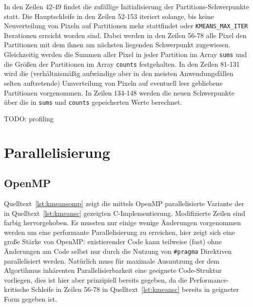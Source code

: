 \documentclass[ngerman, cd=lightcolor, cdmath=false]{tudscrreprt}
\begin{document}
In den Zeilen 42-49 findet die zufällige Initialisierung der
Partitions-Schwerpunkte statt. Die Hauptschleife in den Zeilen 52-153 iteriert
solange, bis keine Neuverteilung von Pixeln auf Partitionen mehr stattfindet
oder \texttt{KMEANS\_MAX\_ITER} Iterationen erreicht worden sind. Dabei werden
in den Zeilen 56-78 alle Pixel den Partitionen mit dem ihnen am nächsten
liegenden Schwerpunkt zugewiesen. Gleichzeitig werden die Summen aller Pixel in
jeder Partition im Array \texttt{sums} und die Größen der Partitionen im Array
\texttt{counts} festgehalten. In den Zeilen 81-131 wird die (verhältnismäßig
aufwändige aber in den meisten Anwendungsfällen selten auftretende)
Umverteilung von Pixeln auf eventuell leer gebliebene Partitionen vorgenommen.
In Zeilen 134-148 werden die neuen Schwerpunkte über die in \texttt{sums} und
\texttt{counts} gepeicherten Werte berechnet.

TODO: profiling



\chapter{Parallelisierung}
\section{OpenMP}
Quelltext~\ref{lst:kmeansomp} zeigt die mittels OpenMP parallelisierte Variante
der in Quelltext~\ref{lst:kmeansc} gezeigten C-Implementierung. Modifizierte
Zeilen sind farbig hervorgehoben. Es mussten nur einige wenige Änderungen
vorgenommen werden um eine performante Parallelisierung zu erreichen, hier
zeigt sich eine große Stärke von OpenMP: existierender Code kann teilweise
(fast) ohne Änderungen am Code selbst nur durch die Nutzung von
\texttt{\#pragma} Direktiven parallelisiert werden.  Natürlich muss für
maximale Ausnutzung der dem Algortihmus inhärenten Parallelisierbarkeit eine
geeignete Code-Struktur vorliegen, dies ist hier aber prinzipiell bereits
gegeben, da die Performance-kritische Schleife in Zeilen 56-78 in
Quelltext~\ref{lst:kmeansc} bereits in geigneter Form gegeben ist.
\end{document}
